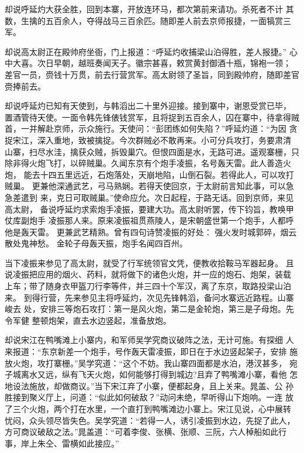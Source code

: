 却说呼延灼大获全胜，回到本寨，开放连环马，都次第前来请功。杀死者不计
其数，生擒的五百余人，夺得战马三百余匹。随即差人前去京师报捷，一面犒赏三
军。

却说高太尉正在殿帅府坐衙，门上报道：“呼延灼收捕梁山泊得胜，差人报捷。”
心中大喜。次日早朝，越班奏闻天子。徽宗甚喜，敕赏黄封御酒十瓶，锦袍一领；
差官一员，赍钱十万贯，前去行营赏军。高太尉领了圣旨，同到殿帅府，随即差官
赍捧前去。

却说呼延灼已知有天使到，与韩滔出二十里外迎接。接到寨中，谢恩受赏已毕，
置酒管待天使。一面令韩先锋俵钱赏军，且将捉到五百余人，囚在寨中，待拿得贼
首，一并解赴京师，示众施行。天使问：“彭团练如何失陷？”呼延灼道：“为因
贪捉宋江，深入重地，致被擒捉。今次群贼必不敢再来。小可分兵攻打，务要肃清
山寨，扫尽水洼，擒获众贼，拆毁巢穴。但恨四面是水，无路可进。遥观寨栅，只
除非得火炮飞打，以碎贼巢。久闻东京有个炮手凌振，名号轰天雷。此人善造火炮，
能去十四五里远近，石炮落处，天崩地陷，山倒石裂。若得此人，可以攻打贼巢。
更兼他深通武艺，弓马熟娴。若得天使回京，于太尉前言知此事，可以急急差遣到
来，克日可取贼巢。”使命应允。次日起程，于路无话。回到京师，来见高太尉，
备说呼延灼求索炮手凌振，要建大功。高太尉听罢，传下钧旨，教唤甲仗库副炮手
凌振那人来。原来凌振祖贯燕陵人，是宋朝盛世第一个炮手，人都呼他是轰天雷。
更兼武艺精熟。曾有四句诗赞凌振的好处：
强火发时城郭碎，烟云散处鬼神愁。
金轮子母轰天振，炮手名闻四百州。

当下凌振来参见了高太尉，就受了行军统领官文凭，便教收拾鞍马军器起身。
且说凌振把应用的烟火、药料，就将做下的诸色火炮，并一应的炮石、炮架，装载
上车；带了随身衣甲盔刀行李等件，并三四十个军汉，离了东京，取路投梁山泊来。
到得行营，先来参见主将呼延灼，次见先锋韩滔，备问水寨远近路程。山寨峻去
处，安排三等炮石攻打：第一是风火炮，第二是金轮炮，第三是子母炮。先令军健
整顿炮架，直去水边竖起，准备放炮。

却说宋江在鸭嘴滩上小寨内，和军师吴学究商议破阵之法，无计可施。有探细
人来报道：“东京新差一个炮手，号作轰天雷凌振，即日在于水边竖起架子，安排
施放火炮，攻打寨栅。”吴学究道：“这个不妨。我山寨四面都是水泊，港汊甚多，
宛子城离水又远，纵有飞天火炮，如何能够打得到城边?且弃了鸭嘴滩小寨，看他
怎地设法施放，却做商议。”当下宋江弃了小寨，便都起身，且上关来。晁盖、公
孙胜接到聚义厅上，问道：“似此如何破敌？”动问未绝，早听得山下炮响。一连
放了三个火炮，两个打在水里，一个直打到鸭嘴滩边小寨上。宋江见说，心中展转
忧闷，众头领尽皆失色。吴学究道：“若得一人，诱引凌振到水边，先捉了此人，
方可商议破敌之法。”晁盖道：“可着李俊、张横、张顺、三阮，六人棹船如此行
事，岸上朱仝、雷横如此接应。”

